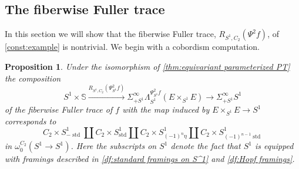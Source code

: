 \documentclass[11pt]{amsart}
\newcommand{\Sph}{\mathbb{S}}
\DeclareMathOperator{\std}{std}
\theoremstyle{plain}   %
\newtheorem{prop}[thm]{Proposition}
\theoremstyle{definition}
\theoremstyle{remark}
\numberwithin{equation}{section}
\begin{document}
\subsection{The fiberwise Fuller trace}

In this section we will show that the fiberwise Fuller trace, $R_{S^1,C_2}(\Psi^2 f)$, of \cref{const:example} is nontrivial. We begin with a cobordism computation. 

\begin{prop}\label{prop:cobordism class of fiberwise Fuller trace}
Under the isomorphism of \cref{thm:equivariant parameterized PT} the composition
\[
S^1\times \Sph \xrightarrow{R_{S^1,C_2}(\Psi_{S^1}^{2}f)} \Sigma_{+S^1}^\infty \Lambda_{S^1}^{\Psi_{S^1}^{2}f}(E\times_{S^1}E) \to \Sigma_{+S^1}^\infty S^1
\]
of the fiberwise Fuller trace of $f$ with the map induced by $E\times_{S^1} E\to S^1$ corresponds to
\[
C_2\times S^1_{-\std}\amalg C_2\times S^1_{\std}\amalg C_2\times S^1_{(-1)^{n}\eta}\amalg C_2\times S^1_{(-1)^{n-1}\std}
\]
in $\omega_{0}^{C_2}(S^1\to S^1)$. Here the subscripts on $S^1$ denote the fact that $S^1$ is equipped with framings described in \cref{df:standard framings on S^1} and \cref{df:Hopf framings}.
\end{prop}
\end{document}
